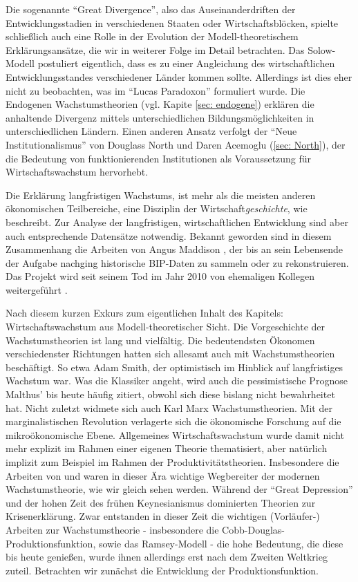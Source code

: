 Die sogenannte "`Great Divergence"', also das Auseinanderdriften der Entwicklungsstadien in verschiedenen Staaten oder Wirtschaftsblöcken, spielte schließlich auch eine Rolle in der Evolution der Modell-theoretischem Erklärungsansätze, die wir in weiterer Folge im Detail betrachten. Das Solow-Modell postuliert eigentlich, dass es zu einer Angleichung des wirtschaftlichen Entwicklungsstandes verschiedener Länder kommen sollte. Allerdings ist dies eher nicht zu beobachten, was im "`Lucas Paradoxon"' formuliert wurde. Die Endogenen Wachstumstheorien (vgl. Kapite \ref{sec: endogene}) erklären die anhaltende Divergenz mittels unterschiedlichen Bildungsmöglichkeiten in unterschiedlichen Ländern. Einen anderen Ansatz verfolgt der "`Neue Institutionalismus"' von Douglass North und Daren Acemoglu (\ref{sec: North}), der die Bedeutung von funktionierenden Institutionen als Voraussetzung für Wirtschaftswachstum hervorhebt. 

Die Erklärung langfristigen Wachstums, ist mehr als die meisten anderen ökonomischen Teilbereiche, eine Disziplin der Wirtschaft\textit{geschichte}, wie \textcite{Baumol1986} beschreibt. Zur Analyse der langfristigen, wirtschaftlichen Entwicklung sind aber auch entsprechende Datensätze notwendig. Bekannt geworden sind in diesem Zusammenhang die Arbeiten von Angus Maddison \parencite{Maddison2010}, der bis an sein Lebensende der Aufgabe nachging historische BIP-Daten zu sammeln oder zu rekonstruieren. Das Projekt wird seit seinem Tod im Jahr 2010 von ehemaligen Kollegen weitergeführt \parencite{Maddison2023}.

Nach diesem kurzen Exkurs zum eigentlichen Inhalt des Kapitels: Wirtschaftswachstum aus Modell-theoretischer Sicht. Die Vorgeschichte der Wachstumstheorien ist lang und vielfältig. Die bedeutendsten Ökonomen verschiedenster Richtungen hatten sich allesamt auch mit Wachstumstheorien beschäftigt. So etwa Adam Smith, der optimistisch im Hinblick auf langfristiges Wachstum war. Was die Klassiker angeht, wird auch die pessimistische Prognose Malthus' bis heute häufig zitiert, obwohl sich diese bislang nicht bewahrheitet hat. Nicht zuletzt widmete sich auch Karl Marx Wachstumstheorien. Mit der marginalistischen Revolution verlagerte sich die ökonomische Forschung auf die mikroökonomische Ebene. Allgemeines Wirtschaftswachstum wurde damit nicht mehr explizit im Rahmen einer eigenen Theorie thematisiert, aber natürlich implizit zum Beispiel im Rahmen der Produktivitätstheorien. Insbesondere die Arbeiten von \textcite{Wicksteed1894} und \textcite{Wicksell1922} waren in dieser Ära wichtige Wegbereiter der modernen Wachstumstheorie, wie wir gleich sehen werden. Während der "`Great Depression"' und der hohen Zeit des frühen Keynesianismus dominierten Theorien zur Krisenerklärung. Zwar entstanden in dieser Zeit die wichtigen (Vorläufer-) Arbeiten zur Wachstumstheorie - insbesondere die Cobb-Douglas-Produktionsfunktion, sowie das Ramsey-Modell - die hohe Bedeutung, die diese bis heute genießen, wurde ihnen allerdings erst nach dem Zweiten Weltkrieg zuteil. Betrachten wir zunächst die Entwicklung der Produktionsfunktion.

